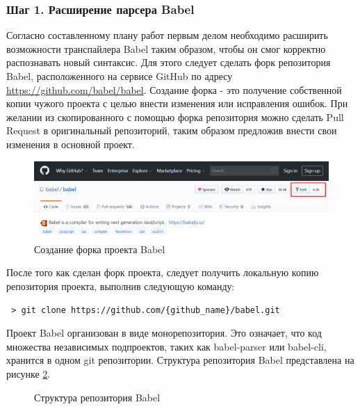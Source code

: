 \documentclass[14pt, a4paper]{article}
\begin{document}
\subsubsection*{Шаг 1. Расширение парсера Babel}
Согласно составленному плану работ первым делом необходимо расширить возможности транспайлера Babel таким образом,
чтобы он смог корректно распознавать новый синтаксис. Для этого следует сделать форк репозитория Babel,
расположенного на сервисе GitHub по адресу \url{https://github.com/babel/babel}. Создание форка - это
получение собственной копии чужого проекта с целью внести изменения или исправления ошибок. При желании
из скопированного с помощью форка репозитория можно сделать Pull Request в оригинальный репозиторий,
таким образом предложив внести свои изменения в основной проект.
\begin{figure}[h!]
  \centering
  \includegraphics[scale=0.55]{img/babel_fork.PNG}
  \caption{Создание форка проекта Babel}
  \label{babel_fork}
\end{figure}

После того как сделан форк проекта, следует получить локальную копию репозитория проекта, выполнив следующую команду:
\begin{lstlisting}
 > git clone https://github.com/{github_name}/babel.git
\end{lstlisting}

Проект Babel организован в виде монорепозитория. Это означает, что код множества независимых подпроектов,
таких как babel-parser или babel-cli, хранится в одном git репозитории. Структура репозитория Babel
представлена на рисунке \ref{babel_dirs}.

\begin{figure}
\centering
{}
\caption{Структура репозитория Babel}
\label{babel_dirs}
\end{figure}
\end{document}
